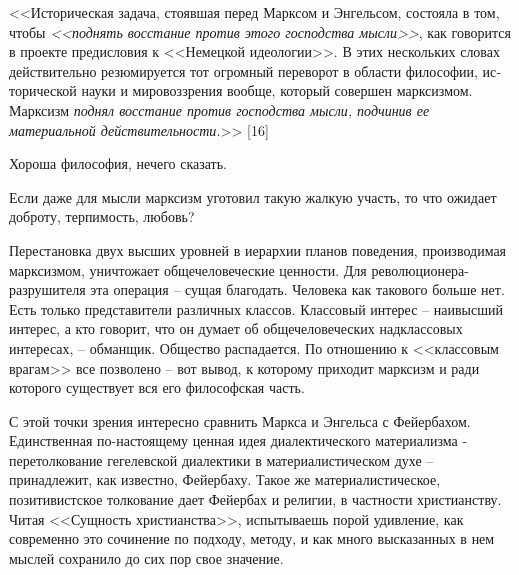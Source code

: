 \documentclass{book}
\begin{document}
<<Историческая задача, стоявшая перед Марксом и Энгельсом, состояла в том, чтобы \textit{<<поднять восстание против этого 
господства мысли>>},  как говорится в проекте предисловия к <<Немецкой идеологии>>. В этих нескольких словах действительно 
резюмируется тот огромный переворот в области философии, ис­торической науки и мировоззрения вообще, который совершен марксизмом. 
Марксизм \textit{поднял восстание против господства мысли, подчинив ее материальной действительности.}>> [16]

Хороша философия, нечего сказать.

Если даже для мысли марксизм уготовил такую жалкую участь, то что ожидает доброту, терпимость, любовь?

Перестановка двух высших уровней в иерархии планов поведения, производимая марксизмом, уничтожает общечеловеческие ценности. Для 
революционера-разрушителя эта операция -- сущая благодать. Человека как такового больше нет. Есть только представители различных 
классов. Классовый интерес -- наивысший интерес, а кто говорит, что он думает об общечеловеческих надклассовых  интересах, -- 
обманщик. Общество распадается. По отношению к <<классовым врагам>> все позволено -- вот вывод, к которому приходит марксизм и 
ради которого существует вся его философская часть.

С этой точки зрения интересно сравнить Маркса и Энгельса с Фейербахом. Единственная по-настоящему ценная идея диалек­тического 
материализма - перетолкование гегелевской диа­лектики в материалистическом духе -- принадлежит, как извест­но, Фейербаху. Такое же 
материалистическое, позитивистское толкование дает Фейербах и религии, в частности христианству. Читая <<Сущность христианства>>, 
испытываешь порой удивле­ние, как современно это сочинение по подходу, методу, и как много высказанных в нем мыслей сохранило до 
сих пор свое значение.
\end{document}
